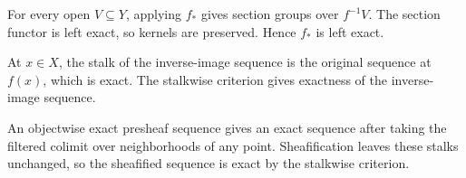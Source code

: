 \begin{solution}[Exercise VI.16.24]
For every open $V\subseteq Y$, applying $f_*$ gives section groups over $f^{-1}V$.  The section functor is left exact, so kernels are preserved.  Hence $f_*$ is left exact.
\end{solution}

\begin{solution}[Exercise VI.16.25]
At $x\in X$, the stalk of the inverse-image sequence is the original sequence at $f(x)$, which is exact.  The stalkwise criterion gives exactness of the inverse-image sequence.
\end{solution}

\begin{solution}[Exercise VI.16.26]
An objectwise exact presheaf sequence gives an exact sequence after taking the filtered colimit over neighborhoods of any point.  Sheafification leaves these stalks unchanged, so the sheafified sequence is exact by the stalkwise criterion.
\end{solution}
